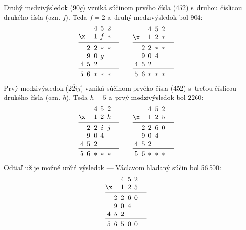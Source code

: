 {Druhý medzivýsledok ($\overline{90g}$) vzniká súčinom prvého čísla (452) s~druhou číslicou druhého čísla (ozn. $f$).
Teda $f=2$ a~druhý medzivýsledok bol 904:
$$
\vbox{\let\\=\cr
\halign{&\hbox to1.0em{\hss$#$\hss}\\
   &&4&5&2 \\
\x &&1&f&* \\
\noalign{\vskip4pt\hrule\vskip4pt}
  &2&2&*&* \\
  &9&0&g&& \\
  4&5&2&&& \\
\noalign{\vskip4pt\hrule\vskip4pt}
 5&6&*&*&* \\
}} \qquad
\vbox{\let\\=\cr
\halign{&\hbox to1.0em{\hss$#$\hss}\\
   &&4&5&2 \\
\x &&1&2&* \\
\noalign{\vskip4pt\hrule\vskip4pt}
  &2&2&*&* \\
  &9&0&4&& \\
  4&5&2&&& \\
\noalign{\vskip4pt\hrule\vskip4pt}
 5&6&*&*&* \\
}}
$$

Prvý medzivýsledok ($\overline{22ij}$) vzniká súčinom prvého čísla (452) s~treťou číslicou druhého čísla (ozn. $h$).
Teda $h=5$ a~prvý medzivýsledok bol 2260:
$$
\vbox{\let\\=\cr
\halign{&\hbox to1.0em{\hss$#$\hss}\\
   &&4&5&2 \\
\x &&1&2&h \\
\noalign{\vskip4pt\hrule\vskip4pt}
  &2&2&i&j \\
  &9&0&4&& \\
  4&5&2&&& \\
\noalign{\vskip4pt\hrule\vskip4pt}
 5&6&*&*&* \\
}} \qquad
\vbox{\let\\=\cr
\halign{&\hbox to1.0em{\hss$#$\hss}\\
   &&4&5&2 \\
\x &&1&2&5 \\
\noalign{\vskip4pt\hrule\vskip4pt}
  &2&2&6&0 \\
  &9&0&4&& \\
  4&5&2&&& \\
\noalign{\vskip4pt\hrule\vskip4pt}
 5&6&*&*&* \\
}}
$$

Odtiaľ už je možné určiť výsledok --- Václavom hľadaný súčin bol 56\,500:
$$
\vbox{\let\\=\cr
\halign{&\hbox to1.0em{\hss$#$\hss}\\
   &&4&5&2 \\
\x &&1&2&5 \\
\noalign{\vskip4pt\hrule\vskip4pt}
  &2&2&6&0 \\
  &9&0&4&& \\
  4&5&2&&& \\
\noalign{\vskip4pt\hrule\vskip4pt}
 5&6&5&0&0 \\
}}
$$

}

